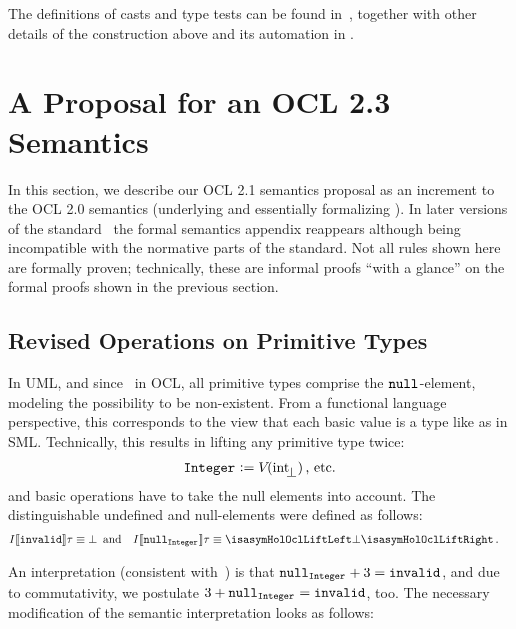 The definitions of casts and type tests can be found
in~\cite{brucker.ea:extensible:2008-b}, together with other details of the
construction above and its automation in \holocl.

\chapter{A Proposal for an OCL 2.3 Semantics}\label{sec:hol-ocl2-semantics}
In this section, we describe our OCL 2.1 semantics proposal as an increment to
the OCL 2.0 semantics (underlying \holocl and essentially formalizing
\cite[Annex A]{omg:ocl:2003}). In later versions of the
standard~\cite{omg:ocl:2006,omg:ocl:2012} the formal semantics appendix reappears although
being incompatible with the normative parts of the standard.  Not all rules
shown here are formally proven; technically, these are informal proofs ``with a
glance'' on the formal proofs shown in the previous section.

\section{Revised Operations on Primitive Types}
In UML, and since~\cite{omg:ocl:2006} in OCL, all primitive types comprise the
$\Null{}$-element, modeling the possibility to be non-existent. From a
functional language perspective, this corresponds to the view that each basic
value is a type like  as in SML. Technically, this
results in lifting any primitive type twice:
\begin{gather*}
  \OclInteger[]  \defeq \V{}{\up{\HolInteger}}\mi{, etc.}
\end{gather*}
and basic operations have to take the null elements into account. The
distinguishable undefined and null-elements were defined as follows:
\begin{align*}
 I\semantics{\OclUndef}\tau \equiv \bottom  &\mi{ and}  \quad
 I\semantics{\Null{\OclInteger[]}}\tau \equiv \lift{\bottom}\mi{.}
\end{align*}

An interpretation (consistent with~\cite{omg:ocl:2006}) is that
$\Null{\OclInteger[]} + 3 = \isasymOclInvalid$, and due to commutativity, we
postulate $3 + \Null{\OclInteger[]} = \isasymOclInvalid$, too.  The necessary
modification of the semantic interpretation looks as follows:

